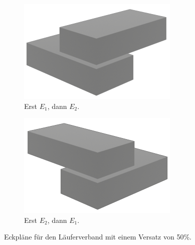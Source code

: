 \begin{figure}[ht!]
    \centering
    \begin{subfigure}[b]{0.3\columnwidth}
      \includegraphics[width=\columnwidth]{fig/concept_streched_bond_corner.png}
      \caption{Erst \(E_1\), dann \(E_2\).}\label{fig:concept:concept_streched_bond_corner}
    \end{subfigure}
    \hfil
    \begin{subfigure}[b]{0.3\columnwidth}
      \includegraphics[width=\columnwidth]{fig/concept_streched_bond_corner_inverse.png}
      \caption{Erst \(E_2\), dann \(E_1\).}\label{fig:concept:concept_streched_bond_corner_inverse}
    \end{subfigure}
    \hfil
  \caption{Eckpläne für den Läuferverband mit einem Versatz von 50\%.}\label{fig:concept:corner_bond}
\end{figure}

